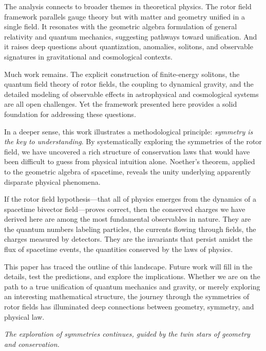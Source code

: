 \documentclass[11pt,a4paper]{article}
\numberwithin{equation}{section}
\theoremstyle{plain}
\theoremstyle{definition}
\theoremstyle{remark}
\newif\ifack
\begin{document}
The analysis connects to broader themes in theoretical physics. The rotor field framework parallels gauge theory but with matter and geometry unified in a single field. It resonates with the geometric algebra formulation of general relativity and quantum mechanics, suggesting pathways toward unification. And it raises deep questions about quantization, anomalies, solitons, and observable signatures in gravitational and cosmological contexts.

Much work remains. The explicit construction of finite-energy solitons, the quantum field theory of rotor fields, the coupling to dynamical gravity, and the detailed modeling of observable effects in astrophysical and cosmological systems are all open challenges. Yet the framework presented here provides a solid foundation for addressing these questions.

In a deeper sense, this work illustrates a methodological principle: \emph{symmetry is the key to understanding}. By systematically exploring the symmetries of the rotor field, we have uncovered a rich structure of conservation laws that would have been difficult to guess from physical intuition alone. Noether's theorem, applied to the geometric algebra of spacetime, reveals the unity underlying apparently disparate physical phenomena.

If the rotor field hypothesis---that all of physics emerges from the dynamics of a spacetime bivector field---proves correct, then the conserved charges we have derived here are among the most fundamental observables in nature. They are the quantum numbers labeling particles, the currents flowing through fields, the charges measured by detectors. They are the invariants that persist amidst the flux of spacetime events, the quantities conserved by the laws of physics.

This paper has traced the outline of this landscape. Future work will fill in the details, test the predictions, and explore the implications. Whether we are on the path to a true unification of quantum mechanics and gravity, or merely exploring an interesting mathematical structure, the journey through the symmetries of rotor fields has illuminated deep connections between geometry, symmetry, and physical law.

\medskip
\noindent\textit{The exploration of symmetries continues, guided by the twin stars of geometry and conservation.}

\ifack
\section*{Acknowledgements}
The author is indebted to the pioneering work of Emmy Noether, whose theorem has guided generations of physicists. The development of geometric algebra by David Hestenes, and its application to gravity by Anthony Lasenby, Chris Doran, and Stephen Gull, provided essential conceptual foundations. This work was conducted independently without external funding. Any errors or omissions are the author's alone.
\fi
\end{document}
